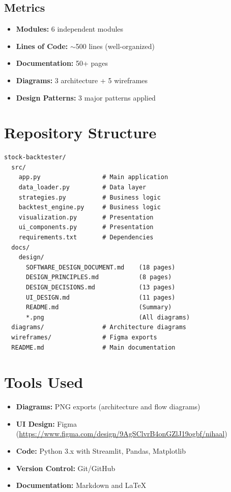 \documentclass[11pt,a4paper]{article}
\begin{document}
\subsection{Metrics}

\begin{itemize}[noitemsep]
    \item \textbf{Modules:} 6 independent modules
    \item \textbf{Lines of Code:} $\sim$500 lines (well-organized)
    \item \textbf{Documentation:} 50+ pages
    \item \textbf{Diagrams:} 3 architecture + 5 wireframes
    \item \textbf{Design Patterns:} 3 major patterns applied
\end{itemize}

\newpage
\section{Repository Structure}

\begin{small}
\begin{verbatim}
stock-backtester/
  src/
    app.py                 # Main application
    data_loader.py         # Data layer
    strategies.py          # Business logic
    backtest_engine.py     # Business logic
    visualization.py       # Presentation
    ui_components.py       # Presentation
    requirements.txt       # Dependencies
  docs/
    design/
      SOFTWARE_DESIGN_DOCUMENT.md    (18 pages)
      DESIGN_PRINCIPLES.md           (8 pages)
      DESIGN_DECISIONS.md            (13 pages)
      UI_DESIGN.md                   (11 pages)
      README.md                      (Summary)
      *.png                          (All diagrams)
  diagrams/                # Architecture diagrams
  wireframes/              # Figma exports
  README.md                # Main documentation
\end{verbatim}
\end{small}

\section{Tools Used}

\begin{itemize}[noitemsep]
    \item \textbf{Diagrams:} PNG exports (architecture and flow diagrams)
    \item \textbf{UI Design:} Figma (\url{https://www.figma.com/design/9AgSClvrB4onGZlJ19ogbf/nihaal})
    \item \textbf{Code:} Python 3.x with Streamlit, Pandas, Matplotlib
    \item \textbf{Version Control:} Git/GitHub
    \item \textbf{Documentation:} Markdown and LaTeX
\end{itemize}
\end{document}
